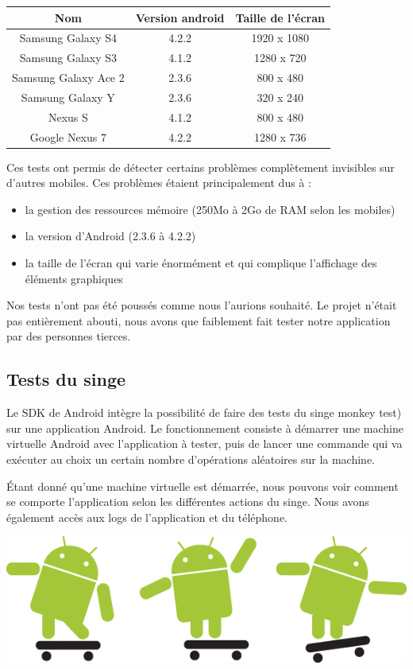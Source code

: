 \documentclass{report}
\begin{document}
\begin{center}
\begin{tabular}{|c|c|c|}
\hline
{\bf Nom} & {\bf Version android} & {\bf Taille de l'écran}\\
\hline
Samsung Galaxy S4 & 4.2.2 & 1920 x 1080\\
\hline
Samsung Galaxy S3 & 4.1.2 & 1280 x 720\\
\hline
Samsung Galaxy Ace 2 & 2.3.6 & 800 x 480\\
\hline
Samsung Galaxy Y & 2.3.6 & 320 x 240\\
\hline
Nexus S & 4.1.2 & 800 x 480\\
\hline
Google Nexus 7 & 4.2.2 & 1280 x 736\\
\hline
\end{tabular}
\end{center}
Ces tests ont permis de détecter certains problèmes complètement
invisibles sur d’autres mobiles. Ces problèmes étaient principalement
dus à :
\bigskip
\begin{itemize}
\item la gestion des ressources mémoire (250Mo à 2Go de RAM selon
les mobiles)
\item la version d’Android (2.3.6 à 4.2.2)
\item la taille de l’écran qui varie énormément et qui complique
l’affichage des éléments graphiques
\end{itemize}
\bigskip

Nos tests n’ont pas été poussés comme nous l’aurions souhaité. Le
projet n’était pas entièrement abouti, nous avons que faiblement fait
tester notre application par des personnes tierces.

\subsection{Tests du singe}
\bigskip


Le SDK de Android intègre la possibilité de faire des tests du singe
monkey test) sur une application Android. Le fonctionnement consiste à
démarrer une machine virtuelle Android avec l’application à tester, puis
de lancer une commande qui va exécuter au choix un certain nombre
d'opérations aléatoires sur la machine.

Étant donné qu’une machine virtuelle est démarrée, nous pouvons voir
comment se comporte l’application selon les différentes actions du
singe. Nous avons également accès aux logs de l’application et du
téléphone.

\begin{center}
\includegraphics[scale=0.8]{images/monkey}
\end{center}
\end{document}
